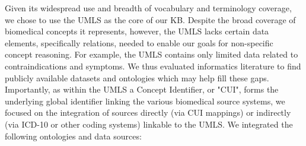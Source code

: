 \documentclass[../main.tex]{subfiles}
\begin{document}
Given its widespread use and breadth of vocabulary and terminology coverage, we chose to use the UMLS as the core of our KB. Despite the broad coverage of biomedical concepts it represents, however, the UMLS lacks certain data elements, specifically relations, needed to enable our goals for non-specific concept reasoning. For example, the UMLS contains only limited data related to contraindications and symptoms. We thus evaluated informatics literature to find publicly available datasets and ontologies which may help fill these gaps. Importantly, as within the UMLS a Concept Identifier, or "CUI", forms the underlying global identifier linking the various biomedical source systems, we focused on the integration of sources directly (via CUI mappings) or indirectly (via ICD-10 or other coding systems) linkable to the UMLS. We integrated the following ontologies and data sources:
\end{document}
